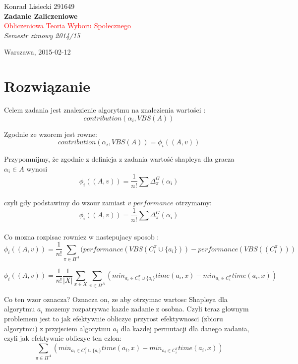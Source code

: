 \documentclass[oneside]{book}
\newcommand*{\titleTH}{\begingroup %
\raggedleft %
\vspace*{\baselineskip} %

{\Large Konrad Lisiecki 291649}\\[0.167\textheight] %

{\LARGE\bfseries Zadanie Zaliczeniowe}\\[\baselineskip] %

{\textcolor{Red}{\Huge Obliczeniowa Teoria Wyboru Społecznego}}\\[\baselineskip] %

{\Large \textit{Semestr zimowy  2014/15  }}\par %

\vfill %

{\large  Warszawa, 2015-02-12}\par %
\renewcommand{\chaptername}{Podpunkt}

\vspace*{3\baselineskip} %
\endgroup}
\begin{document}
 

\pagestyle{empty} %
	

\titleTH %

 


\chapter*{Rozwiązanie}
 
Celem zadania jest znalezienie algorytmu na znalezienia wartości 	:
\begin{equation}
contribution(\alpha_i, VBS(A))
\end{equation}

Zgodnie ze wzorem jest rowne:
\begin{equation}
contribution(\alpha_i, VBS(A)) =  \phi_i((A,v))
\end{equation}

Przypomnijmy, że zgodnie
 z definicja z zadania
 wartość shapleya 
 dla gracza $\alpha_i \in A$ wynosi 
 \begin{equation}
 \phi_i((A,v)) = \frac{1}{n!}\sum_{} \Delta_{\pi}^G (\alpha_i)
 \end{equation}
 
 czyli gdy podstawimy do wzour zamiast $v$ $performance$ otrzymamy:
  \begin{equation}
 \phi_i((A,v)) = \frac{1}{n!}\sum_{} \Delta_{\pi}^G (\alpha_i)
 \end{equation}
 
Co mozna rozpisac rowniez w nastepujacy sposob :
  \begin{equation}
 \phi_i((A,v)) = \frac{1}{n!}\sum_{\pi \in \Pi^A} ( performance(VBS(C_i^{\pi} \cup \{a_i\})) -  performance(VBS((C_i^{\pi})) )
 \end{equation}
 
 
   \begin{equation}
 \phi_i((A,v)) =\frac{1}{n!} \frac{1}{ |X|}    \sum _{x \in X} \sum_{\pi \in \Pi^A} (   min_{a_i \in C_i^{\pi}  \cup \{a_i\}} time(a_i, x)  - min_{a_i \in C_i^{\pi}  } time(a_i, x) )
 \end{equation}
 
 Co ten wzor oznacza? Oznacza on, ze aby otrzymac wartosc Shapleya dla algorytmu $a_i$ mozemy rozpatrywac kazde zadanie z osobna.
 Czyli teraz glownym problemem jest to jak efektywnie obliczyc przyrost efektywnosci (zbioru algorytmu) z przyjsciem algorytmu $a_i$ dla kazdej permutacji dla danego zadania, czyli jak efektywnie obliczyc ten czlon:
  \begin{equation}
 \sum_{\pi \in \Pi^A} (   min_{a_i \in C_i^{\pi}  \cup \{a_i\}} time(a_i, x)  - min_{a_i \in C_i^{\pi}  } time(a_i, x) )
 \end{equation} 
 
\end{document}
